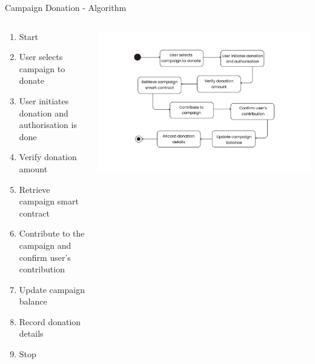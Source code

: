 \documentclass{beamer}
\begin{document}
  \begin{frame}{Campaign Donation - Algorithm}
   \begin{columns}[T]
        \begin{column}{0.53\textwidth}
        \fontsize{10}{12}\selectfont
        \begin{enumerate}
             \item Start
           \item User selects campaign to donate
           \item User initiates donation and authorisation is done
           \item Verify donation amount
           \item Retrieve campaign smart contract
           \item Contribute to the campaign and confirm user's contribution
           \item Update campaign balance
           \item Record donation details
           \item Stop
        \end{enumerate}
        \end{column}
        \begin{column}{0.73\textwidth}
            \includegraphics[width=\linewidth]{assets/donation_state_chart.png} 
        \end{column}
    \end{columns}
    \end{frame}
\end{document}
